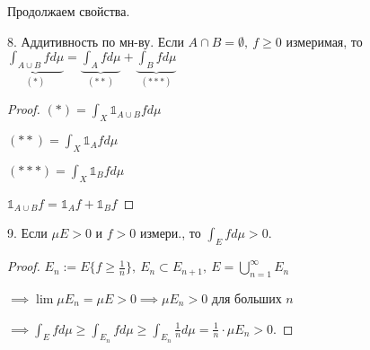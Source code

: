 \begin{properties}
    Продолжаем свойства.

    8. Аддитивность по мн-ву. Если $A \cap B = \emptyset, \ f \geq 0$ измеримая, то 
    $\underbrace{\int_{A\cup B}{f d \mu}}_{(*)} = \underbrace{\int_A{f d \mu}}_{(**)} + \underbrace{\int_B{f d \mu}}_{(***)}$

    \begin{proof}
        $(*) = \int_X{\mathds{1}_{A \cup B} f d \mu}$

        $(**) = \int_X{\mathds{1}_{A} f d \mu}$

        $(***) = \int_X{\mathds{1}_{B} f d \mu}$

        $\mathds{1}_{A \cup B} f = \mathds{1}_A f + \mathds{1}_B f$
    \end{proof}

    9. Если $\mu E > 0$ и $f > 0$ измери., то $\int_E{f d \mu} > 0$.

    \begin{proof}
        $E_n := E \{ f \geq \frac{1}{n} \}, \ E_n \subset E_{n+1}, \ E = \bigcup_{n=1}^{\infty} E_n$

        $\implies \lim{\mu E_n} = \mu E > 0 \implies \mu E_n > 0$ для больших $n$

        $\implies \int_E{f d \mu} \geq \int_{E_n} f d \mu \geq \int_{E_n} {\frac{1}{n} d \mu} = \frac{1}{n} \cdot \mu E_n > 0$.
    \end{proof}
\end{properties}

